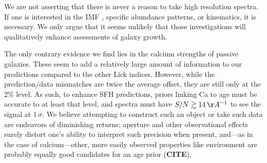 \documentclass[a4paper,fleqn,usenatbib]{mnras}
\newcommand{\bfr}{\bf\color{red}}
\newcommand{\CITE}{{\bfr CITE}}
\begin{document}




We are not asserting that there is never a reason to take high resolution spectra. If 
one is interested in the IMF \citep{Conroy12}, specific abundance patterns, or kinematics, it is 
necessary. We only argue that it seems unlikely that those investigations will
qualitatively enhance assessments of galaxy growth.

The only contrary evidence we find lies in the calcium strengths of passive galaxies. These seem to 
add a relatively large amount of information to our predictions compared to the other Lick indices. 
However, while the prediction/data mismatches are twice the average offset, they are still only at 
the 2\% level. As such, to enhance SFH predictions, priors 
linking Ca to age must be accurate to at least that level, and spectra must have 
$S/N\gtrsim14\,\AA^{-1}$ to see the signal at $1\,\sigma$. We believe attempting to construct 
such an object or take such data are endeavors of diminishing returns: aperture and other 
observational effects surely distort one's ability to interpret such precision when present, 
and---as in the case of calcium---other, more easily observed properties like environment
are probably equally good candidates for an age prior (\CITE).
\end{document}
